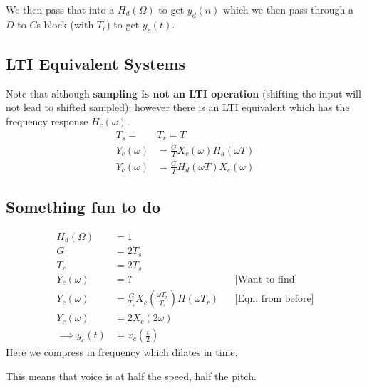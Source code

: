 We then pass that into a $H_d(\Omega)$ to get $y_d(n)$ which we then pass through a $D$-to-$C$s block (with $T_r$) to get $y_c(t)$.


\hrulefill

\subsection{LTI Equivalent Systems}
Note that although \textbf{sampling is not an LTI operation} (shifting the input will not lead to shifted sampled); however there is an LTI equivalent which has the frequency response $H_c(\omega)$.
\begin{align*}
    T_s = 
    &T_r = T
    \\
    Y_c(\omega) 
    &= \frac{G}{T} X_c(\omega) H_d(\omega T) 
    \\
    Y_c(\omega) 
    &= \frac{G}{T} H_d(\omega T) X_c(\omega)
\end{align*}

\subsection{ Something fun to do}

\begin{align*}
    H_d(\Omega)
    &=1
    \\
    G
    &= 2T_s
    \\
    T_r
    &= 2T_s
    \\
    Y_c(\omega) 
    &= ?
    &&\text{[Want to find]}
    \\
    Y_c(\omega) 
    &=
    \frac G{T_s}X_c\left(\frac{\omega T_r}{T_s}\right) H\left({\omega T_r}\right)
    &&\text{[Eqn. from before]}
    \\
    Y_c(\omega) 
    &=
    2X_c(2\omega)
    \\
    \implies
    y_c(t) 
    &= 
    x_c(\frac t2)
\end{align*}
Here we compress in frequency which dilates in time.

This means that voice is at half the speed, half the pitch.
